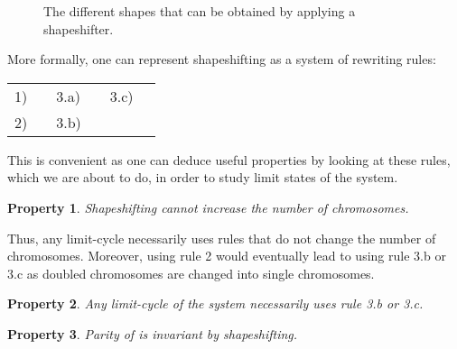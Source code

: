 \documentclass[11pt,final,twoside,nofrench]{thlifl}
\newcommand{\fst}[1]{ \ensuremath{#1} }
\newcommand{\snd}[1]{ \ensuremath{\overline{#1}} }
\newtheorem{property}{Property}
\begin{document}
{\begin{figure}[htbp]
    \caption{The different shapes that can be obtained by applying a shapeshifter.}
    \label{fig:shapeshift1}
\end{figure}

More formally, one can represent shapeshifting as a system of rewriting rules:
\begin{center}
    \begin{tabular}{ll@{}ll@{}ll}
        1) & {}   & 3.a) & {} & 3.c) & {} \\
        2) & {} & 3.b) & {} \\
    \end{tabular}
\end{center}

This is convenient as one can deduce useful properties by looking at these rules, which we are about to do, in order to study limit states of the system.

\begin{property}
\label{prop:decreasing}
 Shapeshifting cannot increase the number of chromosomes.
\end{property}

Thus, any limit-cycle necessarily uses rules that do not change the number of chromosomes. Moreover, using rule 2 would eventually lead to using rule 3.b or 3.c as doubled chromosomes are changed into single chromosomes.

\begin{property}
\label{prop:limitcycle}
Any limit-cycle of the system necessarily uses rule 3.b or 3.c.
\end{property}

\begin{property}
\label{prop:invariant}
  Parity of  is invariant by shapeshifting.
\end{property}

}
\end{document}
